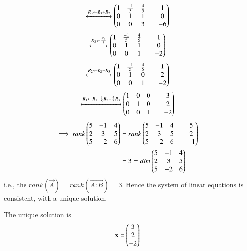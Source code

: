 \documentclass[journal,12pt,twocolumn]{IEEEtran}
\begin{document}
\begin{align}
	\xleftrightarrow[]{ R_3 \leftarrow R_3+R_2}
        \begin{pmatrix}1 & \frac{-1}{5} & \frac{4}{5} & & 1 \\ 
	       0 & 1 & 1 & & 0 \\ 0 & 0 & 3 & & -6\end{pmatrix}
\end{align}
\begin{align}
	\xleftrightarrow[]{R_3 \leftarrow \frac{R_3}{3}}
        \begin{pmatrix}1 & \frac{-1}{5} & \frac{4}{5} & & 1 \\ 
	       0 & 1 & 1 & & 0 \\ 0 & 0 & 1 & & -2\end{pmatrix}
\end{align}
\begin{align}
	\xleftrightarrow[]{R_2 \leftarrow R_2-R_3}
        \begin{pmatrix}1 & \frac{-1}{5} & \frac{4}{5} & & 1 \\ 
	       0 & 1 & 0 & & 2 \\ 0 & 0 & 1 & & -2\end{pmatrix}
\end{align}
\begin{align}
	\xleftrightarrow[]{R_1 \leftarrow R_1+\frac{1}{5}R_2-\frac{4}{5}R_3}
        \begin{pmatrix}1 & 0 & 0 & & 3 \\ 
	       0 & 1 & 0 & & 2 \\ 0 & 0 & 1 & & -2\end{pmatrix}
\end{align}
\begin{align}
	\implies rank \begin{pmatrix} 5 & -1 & 4 \\ 2 &  3 & 5 \\ 5 & -2 & 6 \end{pmatrix}
	&=
	rank \begin{pmatrix} 5 & -1 & 4 & & 5 \\ 2 & 3 & 5 & & 2 \\ 5 & -2 & 6 & & -1\end{pmatrix}
		\nonumber \\
	&= 3 = dim \begin{pmatrix} 5 & -1 & 4 \\ 2 &  3 & 5 \\ 5 & -2 & 6 \end{pmatrix}
\end{align}
i.e., the $rank(\vec{A}) = rank(\vec{A:B}) = 3$. Hence the system of linear equations is consistent, with a unique solution. 

The unique solution is 
\begin{align}
	\mathbf{x} = \begin{pmatrix}3\\2\\-2\end{pmatrix}
\end{align}
\end{document}
